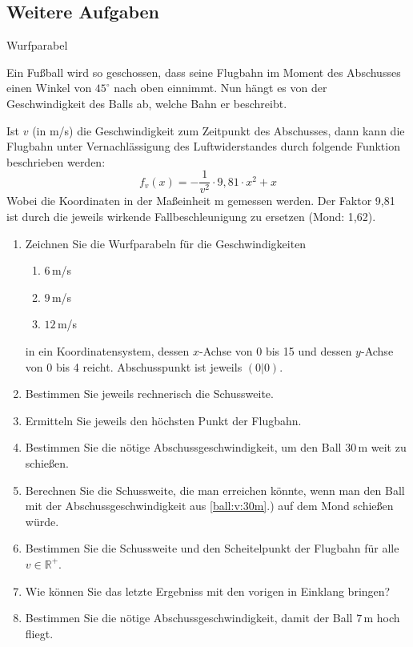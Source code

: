 \documentclass[12pt,a4paper,twoside,fleqn]{article}
\begin{document}
  \subsection{Weitere Aufgaben}
  \begin{question}
    Wurfparabel

    Ein Fußball wird so geschossen, dass seine Flugbahn im Moment des Abschusses
    einen Winkel von $45^\circ$ nach oben einnimmt. Nun hängt es von der
    Geschwindigkeit des Balls ab, welche Bahn er beschreibt.

    Ist $v$ (in m/s) die Geschwindigkeit zum Zeitpunkt des Abschusses, dann
    kann die Flugbahn unter Vernachlässigung des Luftwiderstandes
    durch folgende Funktion beschrieben werden: 
    $$f_v(x)=-\frac 1 {v^2} \cdot 9,81\cdot x^2 + x$$
    Wobei die Koordinaten in der Maßeinheit m gemessen werden.
    Der Faktor 9,81 ist durch die jeweils wirkende
    Fallbeschleunigung zu ersetzen (Mond: 1,62). 

  \begin{enumerate}
  \item Zeichnen Sie die Wurfparabeln für die Geschwindigkeiten
    \begin{multicols}{3}
      \begin{enumerate}
      \item $6\,$m/s
      \item $9\,$m/s
      \item $12\,$m/s
      \end{enumerate}
    \end{multicols}
    in ein Koordinatensystem, dessen $x$-Achse von 0 bis 15 und dessen
    $y$-Achse von 0 bis 4 reicht. Abschusspunkt ist jeweils $(0|0)$. 
  \item Bestimmen Sie jeweils rechnerisch  die Schussweite.
  \item Ermitteln Sie jeweils den höchsten Punkt der Flugbahn.
  \item \label{ball:v:30m}Bestimmen Sie die nötige Abschussgeschwindigkeit, um den Ball
    $30\,$m weit zu schießen.
  \item Berechnen Sie die Schussweite, die man erreichen könnte, wenn
    man den Ball mit der Abschussgeschwindigkeit aus \ref{ball:v:30m}.)
    auf dem Mond schießen würde.
  \item Bestimmen Sie die Schussweite und den Scheitelpunkt der
    Flugbahn für alle $v\in\mathbb{R}^+$.
  \item Wie können Sie das letzte Ergebniss mit den vorigen in
    Einklang bringen?
  \item Bestimmen Sie die nötige Abschussgeschwindigkeit, damit der
    Ball $7\,$m hoch fliegt.
  \end{enumerate}
\end{question}
\end{document}
